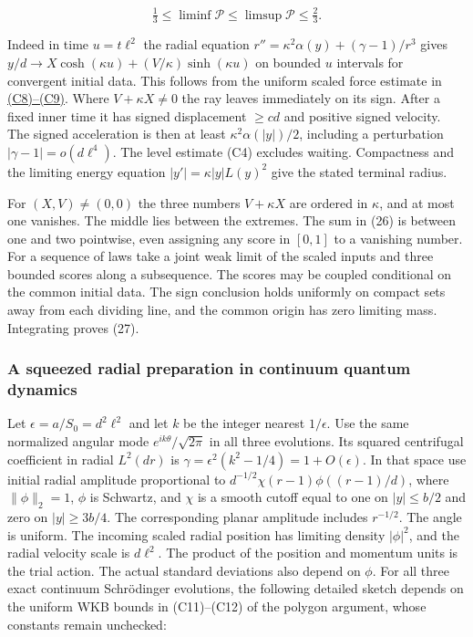 \documentclass[11pt,a4paper]{article}
\begin{document}
\[
                  \tfrac13\le\liminf\mathcal P
                 \le\limsup\mathcal P\le\tfrac23 .                \tag{27}
\]

Indeed in time \(u=t\ell^2\) the radial equation
\(r''=\kappa^2\alpha(y)+(\gamma-1)/r^3\) gives
\(y/d\to X\cosh(\kappa u)+(V/\kappa)\sinh(\kappa u)\) on bounded \(u\)
intervals for convergent initial data. This follows from the uniform
scaled force estimate in
\href{balaban-ode-lesson.md\#which-part-of-the-initial-preparation-leaves-on-each-side}{(C8)--(C9)}.
Where \(V+\kappa X\ne0\) the ray leaves immediately on its sign. After a
fixed inner time it has signed displacement \(\ge c d\) and positive
signed velocity. The signed acceleration is then at least
\(\kappa^2\alpha(|y|)/2\), including a perturbation
\(|\gamma-1|=o(d\ell^4)\). The level estimate (C4) excludes waiting.
Compactness and the limiting energy equation \(|y'|=\kappa|y|L(y)^2\)
give the stated terminal radius.

For \((X,V)\ne(0,0)\) the three numbers \(V+\kappa X\) are ordered in
\(\kappa\), and at most one vanishes. The middle lies between the
extremes. The sum in (26) is between one and two pointwise, even
assigning any score in \([0,1]\) to a vanishing number. For a sequence
of laws take a joint weak limit of the scaled inputs and three bounded
scores along a subsequence. The scores may be coupled conditional on the
common initial data. The sign conclusion holds uniformly on compact sets
away from each dividing line, and the common origin has zero limiting
mass. Integrating proves (27).

\subsubsection{A squeezed radial preparation in continuum quantum
dynamics}\label{a-squeezed-radial-preparation-in-continuum-quantum-dynamics}

Let \(\epsilon=a/S_0=d^2\ell^2\) and let \(k\) be the integer nearest
\(1/\epsilon\). Use the same normalized angular mode
\(e^{ik\theta}/\sqrt{2\pi}\) in all three evolutions. Its squared
centrifugal coefficient in radial \(L^2(dr)\) is
\(\gamma=\epsilon^2(k^2-1/4)=1+O(\epsilon)\). In that space use initial
radial amplitude proportional to \(d^{-1/2}\chi(r-1)\phi((r-1)/d)\),
where \(\|\phi\|_2=1\), \(\phi\) is Schwartz, and \(\chi\) is a smooth
cutoff equal to one on \(|y|\le b/2\) and zero on \(|y|\ge3b/4\). The
corresponding planar amplitude includes \(r^{-1/2}\). The angle is
uniform. The incoming scaled radial position has limiting density
\(|\phi|^2\), and the radial velocity scale is \(d\ell^2\). The product
of the position and momentum units is the trial action. The actual
standard deviations also depend on \(\phi\). For all three exact
continuum Schrödinger evolutions, the following detailed sketch depends
on the uniform WKB bounds in (C11)--(C12) of the polygon argument, whose
constants remain unchecked:
\end{document}
